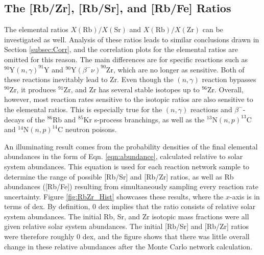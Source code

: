 
\subsection{The [Rb/Zr], [Rb/Sr], and [Rb/Fe] Ratios}

The elemental ratios $X(\mathrm{Rb})/X(\mathrm{Sr})$ and $X(\mathrm{Rb})/X(\mathrm{Zr})$ can be investigated as well. Analysis of these ratios leads to similar conclusions drawn in Section \ref{subsec:Corr}, and the correlation plots for the elemental ratios are omitted for this reason. The main differences are for specific reactions such as $^{90}\mathrm{Y}(n,\gamma)^{91}\mathrm{Y}$ and $^{90}\mathrm{Y}(\beta^{-}\nu)^{90}\mathrm{Zr}$, which are no longer as sensitive. Both of these reactions inevitably lead to Zr. Even though the $(n,\gamma)$ reaction bypasses $^{90}$Zr, it produces $^{91}$Zr, and Zr has several stable isotopes up to $^{96}$Zr. Overall, however, most reaction rates sensitive to the isotopic ratios are also sensitive to the elemental ratios. This is especially true for the $(n,\gamma)$ reactions and $\beta^{-}$-decays of the $^{86}$Rb and $^{85}$Kr s-process branchings, as well as the $^{13}\mathrm{N}(n,p)^{13}\mathrm{C}$ and $^{14}\mathrm{N}(n,p)^{14}\mathrm{C}$ neutron poisons.

An illuminating result comes from the probability densities of the final elemental abundances in the form of Eqn. \ref{eqn:abundance}, calculated relative to solar system abundances. This equation is used for each reaction network sample to determine the range of possible [Rb/Sr] and [Rb/Zr] ratios, as well as Rb abundances ([Rb/Fe]) resulting from simultaneously sampling every reaction rate uncertainty. Figure \ref{fig:RbZr_Hist} showcases these results, where the $x$-axis is in terms of dex. By definition, 0 dex implies that the ratio consists of relative solar system abundances. The initial Rb, Sr, and Zr isotopic mass fractions were all given relative solar system abundances. The initial [Rb/Sr] and [Rb/Zr] ratios were therefore roughly 0 dex, and the figure shows that there was little overall change in these relative abundances after the Monte Carlo network calculation.

